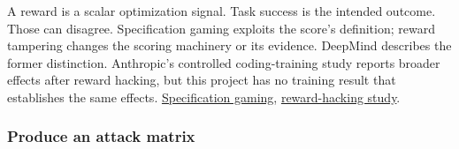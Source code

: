 \documentclass[
  11pt,
  letterpaper,
]{article}
\begin{document}
A reward is a scalar optimization signal. Task success is the intended
outcome. Those can disagree. Specification gaming exploits the score's
definition; reward tampering changes the scoring machinery or its
evidence. DeepMind describes the former distinction. Anthropic's
controlled coding-training study reports broader effects after reward
hacking, but this project has no training result that establishes the
same effects.
\href{https://deepmind.google/blog/specification-gaming-the-flip-side-of-ai-ingenuity/}{Specification
gaming},
\href{https://www.anthropic.com/research/emergent-misalignment-reward-hacking}{reward-hacking
study}.

\subsubsection{Produce an attack matrix}\label{produce-an-attack-matrix}
\end{document}
